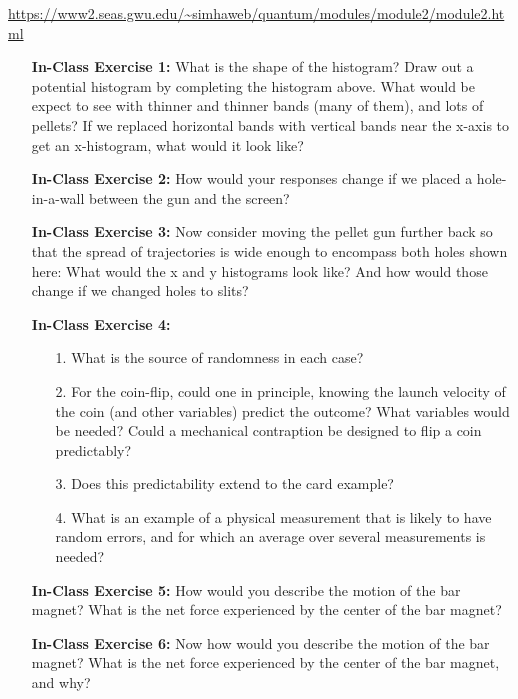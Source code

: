 \documentclass[main.tex]{subfiles}
\begin{document}
\url{https://www2.seas.gwu.edu/~simhaweb/quantum/modules/module2/module2.html}

\begin{enumerate}

\item[] \textbf{In-Class Exercise 1:}  What is the shape of the histogram? Draw out a potential histogram by completing the histogram above. What would be expect to see with thinner and thinner bands (many of them), and lots of pellets? If we replaced horizontal bands with vertical bands near the x-axis to get an x-histogram, what would it look like? 

\item[] \textbf{In-Class Exercise 2:} How would your responses change if we placed a hole-in-a-wall between the gun and the screen?

\item[] \textbf{In-Class Exercise 3:} Now consider moving the pellet gun further back so that the spread of trajectories is wide enough to encompass both holes shown here: What would the x and y histograms look like? And how would those change if we changed holes to slits?

\item[] \textbf{In-Class Exercise 4:}

    \begin{enumerate}
        \item[1.] What is the source of randomness in each case?
        \item[2.] For the coin-flip, could one in principle, knowing the launch velocity of the coin (and other variables) predict the outcome? What variables would be needed? Could a mechanical contraption be designed to flip a coin predictably?
        \item[3.] Does this predictability extend to the card example?
        \item[4.] What is an example of a physical measurement that is likely to have random errors, and for which an average over several measurements is needed?
    \end{enumerate}

\item[] \textbf{In-Class Exercise 5:} How would you describe the motion of the bar magnet? What is the net force experienced by the center of the bar magnet?

\item[] \textbf{In-Class Exercise 6:} Now how would you describe the motion of the bar magnet? What is the net force experienced by the center of the bar magnet, and why?


\end{enumerate}
\end{document}
